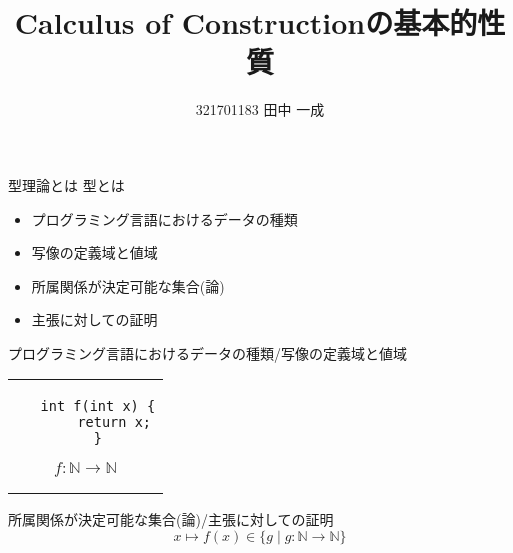\documentclass[18pt]{beamer}
\title{Calculus of Constructionの基本的性質}
\author{321701183 田中 一成}
\begin{document}
\frame{\maketitle}

\begin{frame}{型理論とは}
 型とは
 \begin{itemize}
  \item プログラミング言語におけるデータの種類
  \item 写像の定義域と値域
  \item 所属関係が決定可能な集合(論)
  \item 主張に対しての証明
 \end{itemize}
\end{frame}

\begin{frame}[fragile]{プログラミング言語におけるデータの種類/写像の定義域と値域}
\begin{tabular}{c}
 \begin{minipage}{0.5\textwidth}
  \begin{verbatim}
   int f(int x) {
       return x;
   }
  \end{verbatim}
 \end{minipage}
 \begin{minipage}{0.5\textwidth}
 \[
 f \colon \mathbb{N} \rightarrow \mathbb{N}
 \]
 \end{minipage}
\end{tabular}
\end{frame}


\begin{frame}[fragile]{所属関係が決定可能な集合(論)/主張に対しての証明}
 \[
 x \mapsto f (x) \in \{ g \mid g \colon \mathbb{N} \rightarrow \mathbb{N} \}
 \]
\begin{prooftree}
\end{prooftree}
\end{frame}
\end{document}
